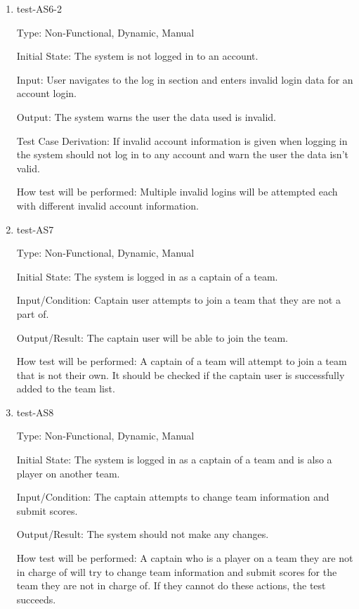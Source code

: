 \documentclass[12pt, titlepage]{article}
\begin{document}
\begin{enumerate}
  \item{test-AS6-2\\}

  Type: Non-Functional, Dynamic, Manual

  Initial State: The system is not logged in to an account.

  Input: User navigates to the log in section and enters invalid login data
  for an account login.

  Output: The system warns the user the data used is invalid.

  Test Case Derivation: If invalid account information is given when logging
  in the system should not log in to any account and warn the user the data
  isn't valid.

  How test will be performed: Multiple invalid logins will be attempted each
  with different invalid account information.

  \item{test-AS7\\}
  
  Type: Non-Functional, Dynamic, Manual
            
  Initial State: The system is logged in as a captain of a team. 
            
  Input/Condition: Captain user attempts to join a team that they are not a part
  of.
            
  Output/Result: The captain user will be able to join the team.
            
  How test will be performed: A captain of a team will attempt to join a
  team that is not their own. It should be checked if the captain user is
  successfully added to the team list.

  \item{test-AS8\\}

  Type: Non-Functional, Dynamic, Manual

  Initial State: The system is logged in as a captain of a team and is also a
  player on another team.

  Input/Condition: The captain attempts to change team information and submit
  scores.

  Output/Result: The system should not make any changes.

  How test will be performed: A captain who is a player on a team they are not
  in charge of will try to change team information and submit scores for the
  team they are not in charge of. If they cannot do these actions, the test
  succeeds.


\end{enumerate}
\end{document}
